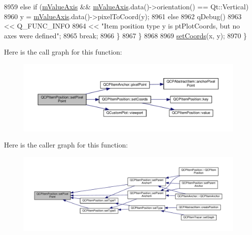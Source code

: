 \begin{DoxyCode}
8959     \textcolor{keywordflow}{else} \textcolor{keywordflow}{if} (\hyperlink{class_q_c_p_item_position_a505dc2da24ba274452c1c817fcaba011}{mValueAxis} && \hyperlink{class_q_c_p_item_position_a505dc2da24ba274452c1c817fcaba011}{mValueAxis}.data()->orientation() == Qt::Vertical)
8960       y = \hyperlink{class_q_c_p_item_position_a505dc2da24ba274452c1c817fcaba011}{mValueAxis}.data()->pixelToCoord(y);
8961     \textcolor{keywordflow}{else}
8962       qDebug()
8963           << Q\_FUNC\_INFO
8964           << \textcolor{stringliteral}{"Item position type y is ptPlotCoords, but no axes were defined"};
8965     \textcolor{keywordflow}{break};
8966   \}
8967   \}
8968 
8969   \hyperlink{class_q_c_p_item_position_aa988ba4e87ab684c9021017dcaba945f}{setCoords}(x, y);
8970 \}
\end{DoxyCode}


Here is the call graph for this function\+:\nopagebreak
\begin{figure}[H]
\begin{center}
\leavevmode
\includegraphics[width=350pt]{class_q_c_p_item_position_ab404e56d9ac2ac2df0382c57933a71ef_cgraph}
\end{center}
\end{figure}




Here is the caller graph for this function\+:\nopagebreak
\begin{figure}[H]
\begin{center}
\leavevmode
\includegraphics[width=350pt]{class_q_c_p_item_position_ab404e56d9ac2ac2df0382c57933a71ef_icgraph}
\end{center}
\end{figure}


